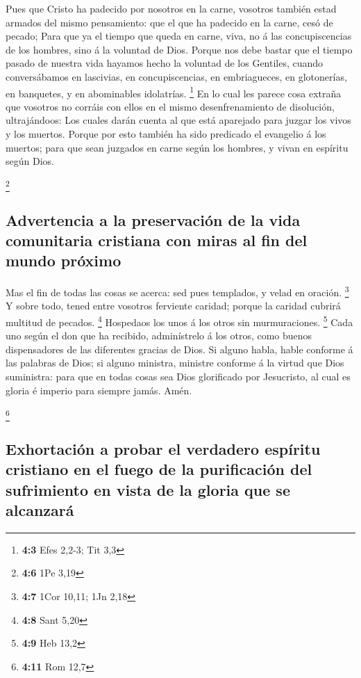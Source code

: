  Pues que Cristo ha padecido por nosotros en la carne,
vosotros también estad armados del mismo pensamiento: que el que ha
padecido en la carne, cesó de pecado;  Para que ya el tiempo
que queda en carne, viva, no á las concupiscencias de los hombres, sino
á la voluntad de Dios.  Porque nos debe bastar que el tiempo
pasado de nuestra vida hayamos hecho la voluntad de los Gentiles, cuando
conversábamos en lascivias, en concupiscencias, en embriagueces, en
glotonerías, en banquetes, y en abominables idolatrías. \footnote{\textbf{4:3}
  Efes 2,2-3; Tit 3,3}  En lo cual les parece cosa extraña
que vosotros no corráis con ellos en el mismo desenfrenamiento de
disolución, ultrajándoos:  Los cuales darán cuenta al que
está aparejado para juzgar los vivos y los muertos.  Porque
por esto también ha sido predicado el evangelio á los muertos; para que
sean juzgados en carne según los hombres, y vivan en espíritu según
Dios.

\footnote{\textbf{4:6} 1Pe 3,19}

\hypertarget{advertencia-a-la-preservaciuxf3n-de-la-vida-comunitaria-cristiana-con-miras-al-fin-del-mundo-pruxf3ximo}{%
\subsection{Advertencia a la preservación de la vida comunitaria
cristiana con miras al fin del mundo
próximo}\label{advertencia-a-la-preservaciuxf3n-de-la-vida-comunitaria-cristiana-con-miras-al-fin-del-mundo-pruxf3ximo}}

 Mas el fin de todas las cosas se acerca: sed pues
templados, y velad en oración. \footnote{\textbf{4:7} 1Cor 10,11; 1Jn
  2,18}  Y sobre todo, tened entre vosotros ferviente
caridad; porque la caridad cubrirá multitud de pecados. \footnote{\textbf{4:8}
  Sant 5,20}  Hospedaos los unos á los otros sin
murmuraciones. \footnote{\textbf{4:9} Heb 13,2}  Cada uno
según el don que ha recibido, adminístrelo á los otros, como buenos
dispensadores de las diferentes gracias de Dios.  Si alguno
habla, hable conforme á las palabras de Dios; si alguno ministra,
ministre conforme á la virtud que Dios suministra: para que en todas
cosas sea Dios glorificado por Jesucristo, al cual es gloria é imperio
para siempre jamás. Amén.

\footnote{\textbf{4:11} Rom 12,7}

\hypertarget{exhortaciuxf3n-a-probar-el-verdadero-espuxedritu-cristiano-en-el-fuego-de-la-purificaciuxf3n-del-sufrimiento-en-vista-de-la-gloria-que-se-alcanzaruxe1}{%
\subsection{Exhortación a probar el verdadero espíritu cristiano en el
fuego de la purificación del sufrimiento en vista de la gloria que se
alcanzará}\label{exhortaciuxf3n-a-probar-el-verdadero-espuxedritu-cristiano-en-el-fuego-de-la-purificaciuxf3n-del-sufrimiento-en-vista-de-la-gloria-que-se-alcanzaruxe1}}

